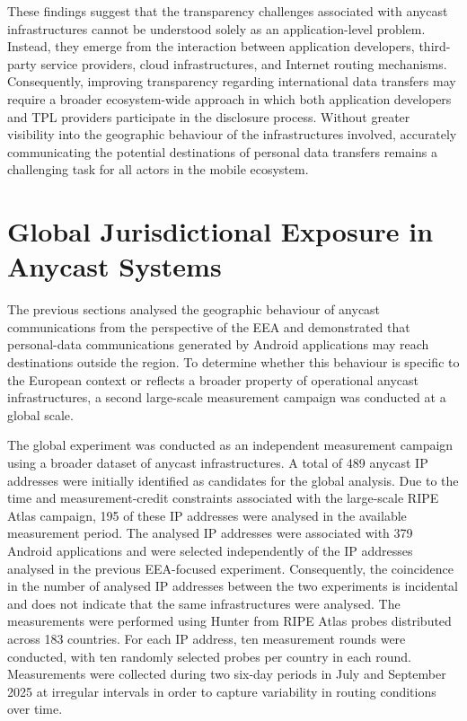 \documentclass[
A4paper,                %
twoside,                %
openright,              %
chapterprefix=true,     %
12pt,                   %
headings=normal,        %
titlepage=on            %
]{book}
\begin{document}
These findings suggest that the transparency challenges associated with anycast infrastructures cannot be understood solely as an application-level problem. Instead, they emerge from the interaction between application developers, third-party service providers, cloud infrastructures, and Internet routing mechanisms. Consequently, improving transparency regarding international data transfers may require a broader ecosystem-wide approach in which both application developers and TPL providers participate in the disclosure process. Without greater visibility into the geographic behaviour of the infrastructures involved, accurately communicating the potential destinations of personal data transfers remains a challenging task for all actors in the mobile ecosystem.

\section{Global Jurisdictional Exposure in Anycast Systems}
\label{sc:anycast_experiments_global_anycast}

The previous sections analysed the geographic behaviour of anycast communications from the perspective of the EEA and demonstrated that personal-data communications generated by Android applications may reach destinations outside the region. To determine whether this behaviour is specific to the European context or reflects a broader property of operational anycast infrastructures, a second large-scale measurement campaign was conducted at a global scale.

The global experiment was conducted as an independent measurement campaign using a broader dataset of anycast infrastructures. A total of 489 anycast IP addresses were initially identified as candidates for the global analysis. Due to the time and measurement-credit constraints associated with the large-scale RIPE Atlas campaign, 195 of these IP addresses were analysed in the available measurement period. The analysed IP addresses were associated with 379 Android applications and were selected independently of the IP addresses analysed in the previous EEA-focused experiment. Consequently, the coincidence in the number of analysed IP addresses between the two experiments is incidental and does not indicate that the same infrastructures were analysed. The measurements were performed using Hunter from RIPE Atlas probes distributed across 183 countries. For each IP address, ten measurement rounds were conducted, with ten randomly selected probes per country in each round. Measurements were collected during two six-day periods in July and September 2025 at irregular intervals in order to capture variability in routing conditions over time.
\end{document}
